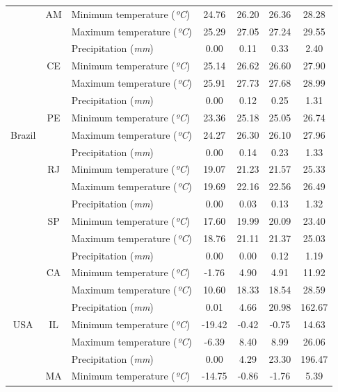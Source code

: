 \begin{scriptsize}
\begin{center}
\begin{longtable}[htb!]{cclcccc}
\multirow{15}{*}{Brazil} & \ac{AM} & Minimum temperature (\textit{ºC}) & 24.76 & 26.20 & 26.36 & 28.28 \\
 &  & Maximum temperature (\textit{ºC}) & 25.29 & 27.05 & 27.24 & 29.55 \\
 &  & Precipitation (\textit{mm}) & 0.00 & 0.11 & 0.33 & 2.40 \\ \cline{2-7}
 & \ac{CE} & Minimum temperature (\textit{ºC}) & 25.14 & 26.62 & 26.60 & 27.90 \\
 &  & Maximum temperature (\textit{ºC}) & 25.91 & 27.73 & 27.68 & 28.99 \\
 &  & Precipitation (\textit{mm}) & 0.00 & 0.12 & 0.25 & 1.31 \\ \cline{2-7}
 & \ac{PE} & Minimum temperature (\textit{ºC}) & 23.36 & 25.18 & 25.05 & 26.74 \\
 &  & Maximum temperature (\textit{ºC}) & 24.27 & 26.30 & 26.10 & 27.96 \\
 &  & Precipitation (\textit{mm}) & 0.00 & 0.14 & 0.23 & 1.33 \\ \cline{2-7}
 & \ac{RJ} & Minimum temperature (\textit{ºC}) & 19.07 & 21.23 & 21.57 & 25.33 \\
 &  & Maximum temperature (\textit{ºC}) & 19.69 & 22.16 & 22.56 & 26.49 \\
 &  & Precipitation (\textit{mm}) & 0.00 & 0.03 & 0.13 & 1.32 \\ \cline{2-7}
 & \ac{SP} & Minimum temperature (\textit{ºC}) & 17.60 & 19.99 & 20.09 & 23.40 \\
 &  & Maximum temperature (\textit{ºC}) & 18.76 & 21.11 & 21.37 & 25.03 \\
 &  & Precipitation (\textit{mm}) & 0.00 & 0.00 & 0.12 & 1.19 \\ \hline
\multirow{15}{*}{\ac{USA}} & {\ac{CA}} & Minimum temperature (\textit{ºC}) & -1.76 & 4.90 & 4.91 & 11.92 \\
 &  & Maximum temperature (\textit{ºC}) & 10.60 & 18.33 & 18.54 & 28.59 \\
 &  & Precipitation (\textit{mm}) & 0.01 & 4.66 & 20.98 & 162.67 \\ \cline{2-7}
 & \ac{IL} & Minimum temperature (\textit{ºC}) & -19.42 & -0.42 & -0.75 & 14.63 \\
 &  & Maximum temperature (\textit{ºC}) & -6.39 & 8.40 & 8.99 & 26.06 \\
 &  & Precipitation (\textit{mm}) & 0.00 & 4.29 & 23.30 & 196.47 \\ \cline{2-7}
 & \ac{MA} & Minimum temperature (\textit{ºC}) & -14.75 & -0.86 & -1.76 & 5.39 \\

\end{longtable}
\end{center}
\end{scriptsize}
